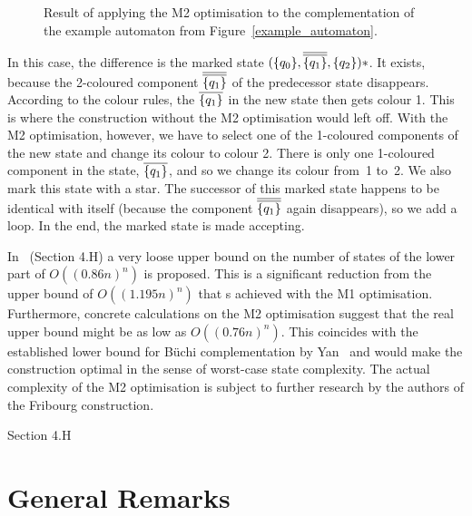 \begin{figure}
\centering
\ComplementWithMTwo
\caption{Result of applying the M2 optimisation to the complementation of the example automaton from Figure~\ref{example_automaton}.}
\label{complement_with_m2}
\end{figure}

In this case, the difference is the marked state $(\qm0, \cl2{\qm1}, \qm2)*$. It exists, because the 2-coloured component $\cl2{\qm1}$ of the predecessor state disappears. According to the colour rules, the $\cl1{\qm1}$ in the new state then gets colour 1. This is where the construction without the M2 optimisation would left off. With the M2 optimisation, however, we have to select one of the 1-coloured components of the new state and change its colour to colour 2. There is only one 1-coloured component in the state, $\cl1{\qm1}$, and so we change its colour from~1 to~2. We also mark this state with a star. The successor of this marked state happens to be identical with itself (because the component $\cl2{\qm1}$ again disappears), so we add a loop. In the end, the marked state is made accepting.

In~\cite{2014_joel_ulrich} (Section 4.H) a very loose upper bound on the number of states of the lower part of $O((0.86n)^n)$ is proposed. This is a significant reduction from the upper bound of $O((1.195n)^n)$ that s achieved with the M1 optimisation. Furthermore, concrete calculations on the M2 optimisation suggest that the real upper bound might be as low as $O((0.76n)^n)$. This coincides with the established lower bound for Büchi complementation by Yan~\cite{DBLP:journals/corr/abs-0802-1226} and would make the construction optimal in the sense of worst-case state complexity. The actual complexity of the M2 optimisation is subject to further research by the authors of the Fribourg construction.

\cite{2014_joel_ulrich} Section 4.H


\section{General Remarks}




